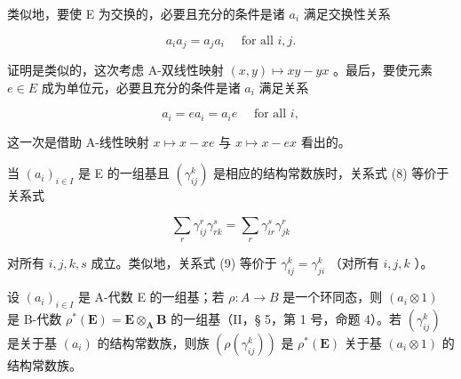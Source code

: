 类似地，要使 E 为交换的，必要且充分的条件是诸 \(a_{i}\) 满足交换性关系

\[
a _ {i} a _ {j} = a _ {j} a _ {i} \quad \text { for   all } i, j.\tag{9}
\]

证明是类似的，这次考虑 A-双线性映射 \((x,y)\mapsto xy - yx\) 。最后，要使元素 \(e\in E\) 成为单位元，必要且充分的条件是诸 \(a_{i}\) 满足关系

\[
a _ {i} = e a _ {i} = a _ {i} e \quad \text { for   all } i,\tag{10}
\]

这一次是借助 A-线性映射 \(x \mapsto x - xe\) 与 \(x \mapsto x - ex\) 看出的。

当 \((a_{i})_{i\in I}\) 是 E 的一组基且 \((\gamma_{ij}^{k})\) 是相应的结构常数族时，关系式 (8) 等价于关系式

\[
\sum_ {r} \gamma_ {i j} ^ {r} \gamma_ {r k} ^ {s} = \sum_ {r} \gamma_ {i r} ^ {s} \gamma_ {j k} ^ {r}
\]

对所有 \(i, j, k, s\) 成立。类似地，关系式 (9) 等价于 \(\gamma_{ij}^{k} = \gamma_{ji}^{k}\) （对所有 \(i, j, k\) ）。

设 \((a_{i})_{i\in I}\) 是 A-代数 E 的一组基；若 \(\rho :A\to B\) 是一个环同态，则 \((a_{i}\otimes 1)\) 是 B-代数 \(\rho^{*}(\mathbf{E}) = \mathbf{E}\otimes_{\mathbf{A}}\mathbf{B}\) 的一组基（II，§ 5，第 1 号，命题 4）。若 \((\gamma_{ij}^{k})\) 是关于基 \((a_{i})\) 的结构常数族，则族 \((\rho (\gamma_{ij}^{k}))\) 是 \(\rho^{*}(\mathbf{E})\) 关于基 \((a_{i}\otimes 1)\) 的结构常数族。

